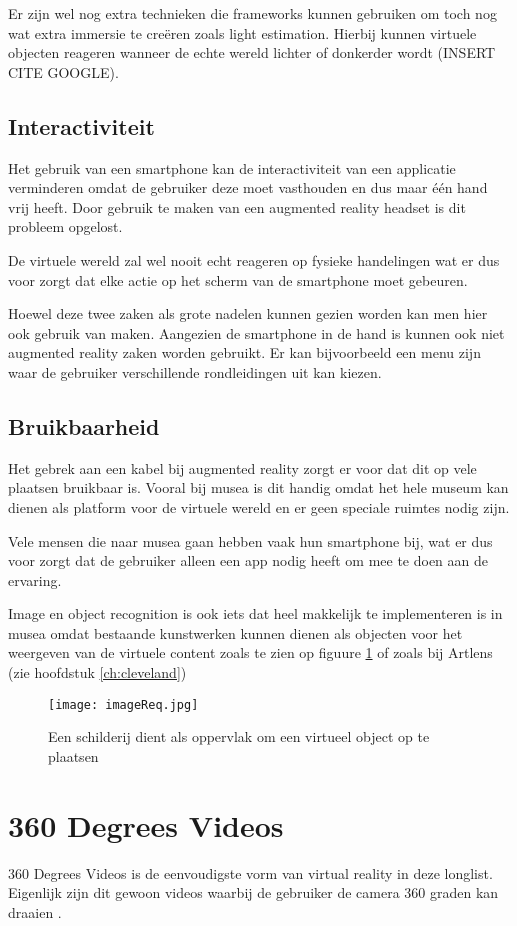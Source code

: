 Er zijn wel nog extra technieken die frameworks kunnen gebruiken om toch nog wat extra immersie te creëren zoals light estimation. Hierbij kunnen virtuele objecten reageren wanneer de echte wereld lichter of donkerder wordt (INSERT CITE GOOGLE).

\subsection{Interactiviteit}
Het gebruik van een smartphone kan de interactiviteit van een applicatie verminderen omdat de gebruiker deze moet vasthouden en dus maar één hand vrij heeft. Door gebruik te maken van een augmented reality headset is dit probleem opgelost.

De virtuele wereld zal wel nooit echt reageren op fysieke handelingen wat er dus voor zorgt dat elke actie op het scherm van de smartphone moet gebeuren.

Hoewel deze twee zaken als grote nadelen kunnen gezien worden kan men hier ook gebruik van maken. Aangezien de smartphone in de hand is kunnen ook niet augmented reality zaken worden gebruikt. Er kan bijvoorbeeld een menu zijn waar de gebruiker verschillende rondleidingen uit kan kiezen.

\subsection{Bruikbaarheid}
Het gebrek aan een kabel bij augmented reality zorgt er voor dat dit op vele plaatsen bruikbaar is. Vooral bij musea is dit handig omdat het hele museum kan dienen als platform voor de virtuele wereld en er geen speciale ruimtes nodig zijn.

Vele mensen die naar musea gaan hebben vaak hun smartphone bij, wat er dus voor zorgt dat de gebruiker alleen een app nodig heeft om mee te doen aan de ervaring.

Image en object recognition is ook iets dat heel makkelijk te implementeren is in musea omdat bestaande kunstwerken kunnen dienen als objecten voor het weergeven van de virtuele content zoals te zien op figuure \ref{fig:imageReq} of zoals bij Artlens (zie hoofdstuk \ref{ch:cleveland})

\begin{figure}
    \texttt{[image: imageReq.jpg]}
    \caption{Een schilderij dient als oppervlak om een virtueel object op te plaatsen}
    \label{fig:imageReq}
\end{figure}

\section{360 Degrees Videos}
360 Degrees Videos is de eenvoudigste vorm van virtual reality in deze longlist. Eigenlijk zijn dit gewoon videos waarbij de gebruiker de camera 360 graden kan draaien \autocite{Hosseini2016}.

